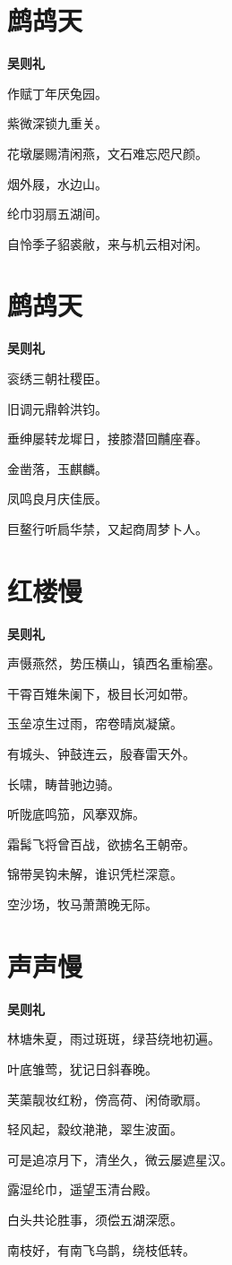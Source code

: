 \documentclass[12pt,a4paper]{ctexbook}
\begin{document}
\section{鹧鸪天}
\textbf{吴则礼}\par\vspace{0.5em}
作赋丁年厌兔园。\par
紫微深锁九重关。\par
花墩屡赐清闲燕，文石难忘咫尺颜。\par
烟外屐，水边山。\par
纶巾羽扇五湖间。\par
自怜季子貂裘敝，来与机云相对闲。\par

\section{鹧鸪天}
\textbf{吴则礼}\par\vspace{0.5em}
衮绣三朝社稷臣。\par
旧调元鼎斡洪钧。\par
垂绅屡转龙墀日，接膝潜回黼座春。\par
金凿落，玉麒麟。\par
凤鸣良月庆佳辰。\par
巨鳌行听扃华禁，又起商周梦卜人。\par

\section{红楼慢}
\textbf{吴则礼}\par\vspace{0.5em}
声慑燕然，势压横山，镇西名重榆塞。\par
干霄百雉朱阑下，极目长河如带。\par
玉垒凉生过雨，帘卷晴岚凝黛。\par
有城头、钟鼓连云，殷春雷天外。\par
长啸，畴昔驰边骑。\par
听陇底鸣笳，风搴双旆。\par
霜髯飞将曾百战，欲掳名王朝帝。\par
锦带吴钩未解，谁识凭栏深意。\par
空沙场，牧马萧萧晚无际。\par

\section{声声慢}
\textbf{吴则礼}\par\vspace{0.5em}
林塘朱夏，雨过斑斑，绿苔绕地初遍。\par
叶底雏莺，犹记日斜春晚。\par
芙蕖靓妆红粉，傍高荷、闲倚歌扇。\par
轻风起，縠纹滟滟，翠生波面。\par
可是追凉月下，清坐久，微云屡遮星汉。\par
露湿纶巾，遥望玉清台殿。\par
白头共论胜事，须偿五湖深愿。\par
南枝好，有南飞乌鹊，绕枝低转。\par
\end{document}
